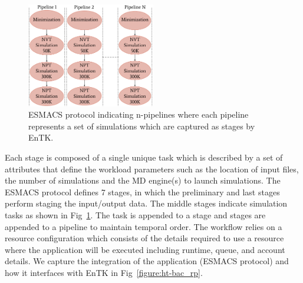\begin{figure}[ht]
\centering
  \includegraphics[width=0.5\textwidth]{FIGURES/HT-BAC_NAMD_pipelines_control_flow_only.pdf}
  \caption{ESMACS protocol indicating n-pipelines where each pipeline
  represents a set of simulations which are captured as stages by
  EnTK.}\label{figure:ESMACS-pipelines}
\end{figure}


Each stage is composed of a single unique task which is described by a set of
attributes that define the workload parameters such as the location of input
files, the number of simulations and the MD engine(s) to launch simulations.
The ESMACS protocol defines 7 stages, in which the preliminary and last
stages perform staging the input/output data. The middle stages indicate
simulation tasks as shown in Fig~\ref{figure:ESMACS-pipelines}. The task is
appended to a stage and stages are appended to a pipeline to maintain
temporal order. The workflow relies on a resource configuration which
consists of the details required to use a resource where the application will
be executed including runtime, queue, and account details. We capture the
integration of the application (ESMACS protocol) and how it interfaces with
EnTK in Fig~\ref{figure:ht-bac_rp}.

